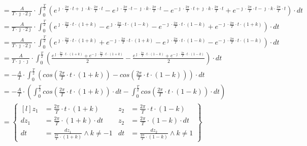 \begin{task}
\begin{align*}
&=\frac{A}{T\cdot \jmath \cdot 2\jmath} \cdot \int_{0}^{\frac{T}{2}}
\left(e^{\jmath \cdot \frac{2\pi}{T} \cdot t + \jmath \cdot k \cdot \frac{2\pi}{T} \cdot t} - e^{\jmath \cdot \frac{2\pi}{T} \cdot t -\jmath \cdot k \cdot \frac{2\pi}{T} \cdot t} - e^{-\jmath \cdot \frac{2\pi}{T} \cdot t+ \jmath \cdot k \cdot \frac{2\pi}{T} \cdot t} + e^{-\jmath \cdot \frac{2\pi}{T} \cdot t -\jmath \cdot k \cdot \frac{2\pi}{T} \cdot t} \right) \cdot dt\\
&=\frac{A}{T\cdot \jmath \cdot 2\jmath} \cdot \int_{0}^{\frac{T}{2}}
\left(e^{\jmath \cdot \frac{2\pi}{T} \cdot t \cdot \left(1+k\right)} - e^{\jmath \cdot \frac{2\pi}{T} \cdot t \cdot \left(1 - k\right)} - e^{-\jmath \cdot \frac{2\pi}{T} \cdot t \cdot \left(1 -k\right)} + e^{-\jmath \cdot \frac{2\pi}{T} \cdot t \cdot \left(1+k\right)} \right) \cdot dt\\
&=\frac{A}{T\cdot\jmath\cdot 2\jmath} \cdot \int_{0}^{\frac{T}{2}}
\left(e^{\jmath \cdot \frac{2\pi}{T} \cdot t \cdot \left(1+k\right)} + e^{-\jmath \cdot \frac{2\pi}{T} \cdot t \cdot \left(1+k\right)} - e^{\jmath \cdot \frac{2\pi}{T} \cdot t \cdot \left(1 - k\right)} - e^{-\jmath \cdot \frac{2\pi}{T} \cdot t \cdot \left(1 -k\right)} \right) \cdot dt\\
&=\frac{A}{T\cdot \jmath \cdot \jmath} \cdot \int_{0}^{\frac{T}{2}}
\left( \frac{e^{\jmath \cdot \frac{2\pi}{T} \cdot t \cdot \left(1+k\right)} + e^{-\jmath \cdot \frac{2\pi}{T} \cdot t \cdot \left(1+k\right)}}{2} - \frac{e^{\jmath \cdot \frac{2\pi}{T} \cdot t \cdot \left(1 - k\right)} + e^{-\jmath \cdot \frac{2\pi}{T} \cdot t \cdot \left(1 -k\right)}}{2} \right) \cdot dt\\
&=-\frac{A}{T} \cdot \int_{0}^{\frac{T}{2}}
\left( cos\left( \frac{2\pi}{T} \cdot t \cdot \left(1+k\right) \right) - cos\left( \frac{2\pi}{T} \cdot t \cdot \left(1 - k\right)\right) \right) \cdot dt\\
&=-\frac{A}{T} \cdot \left( \int_{0}^{\frac{T}{2}}
cos\left( \frac{2\pi}{T} \cdot t \cdot \left(1+k\right) \right) \cdot dt - \int_{0}^{\frac{T}{2}} cos\left( \frac{2\pi}{T} \cdot t \cdot \left(1 - k\right)\right) \cdot dt \right)\\
&=\begin{Bmatrix*}[l]
z_1&=\frac{2\pi}{T} \cdot t \cdot \left(1+k\right) & z_2&=\frac{2\pi}{T} \cdot t \cdot \left(1-k\right)\\
dz_1&=\frac{2\pi}{T} \cdot \left(1+k\right) \cdot dt & z_2&=\frac{2\pi}{T} \cdot \left(1-k\right) \cdot dt\\
dt&=\frac{dz_1}{\frac{2\pi}{T} \cdot \left(1+k\right)} \wedge k \neq -1& dt&=\frac{dz_2}{\frac{2\pi}{T} \cdot \left(1-k\right)} \wedge k \neq 1

\end{Bmatrix*}
\end{align*}
\end{task}
